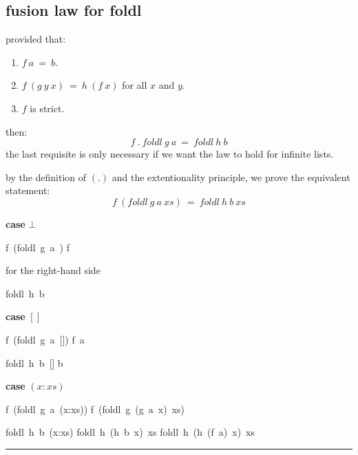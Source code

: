 \documentclass[twoside]{article}
\newenvironment{proof}{{\bf Proof:}}{\hfill\rule{2mm}{2mm}}
\begin{document}
\subsection{fusion law for foldl}
provided that:
\begin{enumerate}
  \item $f~a~=~b$.
  \item $f~(g~y~x)~=~h~(f~x)$ for all $x$ and $y$.
  \item $f$ is strict.
\end{enumerate}
then:
$$f~.~foldl~g~a~=~foldl~h~b$$
the last requisite is only necessary if we want the law to hold for infinite
lists.

\begin{proof}
by the definition of $(.)$ and the extentionality principle, we prove the
equivalent statement:
$$f~(foldl~g~a~xs)~=~foldl~h~b~xs$$

\textbf{case} $\bot$

\begin{minipage}[t]{.4\textwidth}
\begin{calculation}
  f~(foldl~g~a~\bot)
  f~\bot
{}
  \bot
\end{calculation}
\end{minipage}%
\begin{minipage}[t]{.4\textwidth}
for the right-hand side
\begin{calculation}
  foldl~h~b~\bot
{}
  \bot
\end{calculation}
\end{minipage}

\textbf{case} $[]$

\begin{minipage}[t]{.4\textwidth}
\begin{calculation}
  f~(foldl~g~a~[])
  f~a
\end{calculation}
\end{minipage}%
\begin{minipage}[t]{.4\textwidth}
\begin{calculation}
  foldl~h~b~[]
  b
\end{calculation}
\end{minipage}

\textbf{case} $(x:xs)$
\begin{minipage}[t]{.4\textwidth}
\begin{calculation}
  f~(foldl~g~a~(x:xs))
  f~(foldl~g~(g~a~x)~xs)
\end{calculation}
\end{minipage}%
\begin{minipage}[t]{.4\textwidth}
\begin{calculation}
  foldl~h~b~(x:xs)
  foldl~h~(h~b~x)~xs
  foldl~h~(h~(f~a)~x)~xs
\end{calculation}
\end{minipage}


\end{proof}
\end{document}
